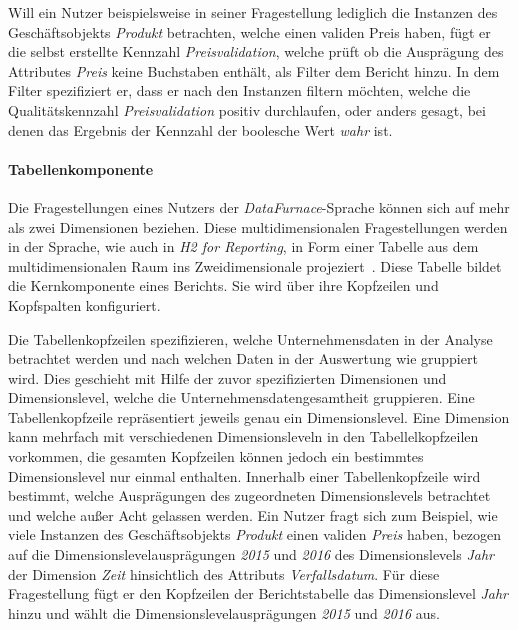 \documentclass[
  language=german, %
  type=bachelor,%
  ngerman
]{isthesis}
\begin{document}
\begin{content}
  Will ein Nutzer beispielsweise in seiner Fragestellung lediglich die
  Instanzen des Geschäftsobjekts \textit{Produkt} betrachten, welche einen
  validen Preis haben, fügt er die selbst erstellte Kennzahl
  \textit{Preisvalidation}, welche prüft ob die Ausprägung des Attributes
  \textit{Preis} keine Buchstaben enthält, als Filter dem Bericht hinzu. In dem
  Filter spezifiziert er, dass er nach den Instanzen filtern möchten, welche
  die Qualitätskennzahl \textit{Preisvalidation} positiv durchlaufen, oder
  anders gesagt, bei denen das Ergebnis der Kennzahl der boolesche Wert
  \textit{wahr} ist.

  \paragraph{Tabellenkomponente}\label{paragraph:tabellenkomponente} 
  Die Fragestellungen eines Nutzers der \textit{DataFurnace}-Sprache können
  sich auf mehr als zwei Dimensionen beziehen. Diese multidimensionalen
  Fragestellungen werden in der Sprache, wie auch in \textit{H2 for Reporting},
  in Form einer Tabelle aus dem multidimensionalen Raum ins Zweidimensionale
  projeziert~\cite[][S.  23]{becker2007h2}. Diese Tabelle bildet die
  Kernkomponente eines Berichts.  Sie wird über ihre Kopfzeilen und Kopfspalten
  konfiguriert.

  Die Tabellenkopfzeilen spezifizieren, welche Unternehmensdaten in der Analyse
  betrachtet werden und nach welchen Daten in der Auswertung wie gruppiert wird. Dies
  geschieht mit Hilfe der zuvor spezifizierten Dimensionen und Dimensionslevel,
  welche die Unternehmensdatengesamtheit gruppieren. Eine Tabellenkopfzeile
  repräsentiert jeweils genau ein Dimensionslevel. Eine Dimension kann mehrfach
  mit verschiedenen Dimensionsleveln in den Tabellelkopfzeilen vorkommen, die gesamten
  Kopfzeilen können jedoch ein bestimmtes Dimensionslevel nur einmal enthalten.
  Innerhalb einer Tabellenkopfzeile wird bestimmt, welche Ausprägungen des
  zugeordneten Dimensionslevels betrachtet und welche außer Acht gelassen
  werden. Ein Nutzer fragt sich zum Beispiel, wie viele Instanzen des
  Geschäftsobjekts \textit{Produkt} einen validen \textit{Preis} haben, bezogen
  auf die Dimensionslevelausprägungen \textit{2015} und \textit{2016} des
  Dimensionslevels \textit{Jahr} der Dimension \textit{Zeit} hinsichtlich des
  Attributs \textit{Verfallsdatum}. Für diese Fragestellung fügt er den
  Kopfzeilen der Berichtstabelle das Dimensionslevel \textit{Jahr} hinzu und
  wählt die Dimensionslevelausprägungen \textit{2015} und \textit{2016} aus.


\end{content}
\end{document}

